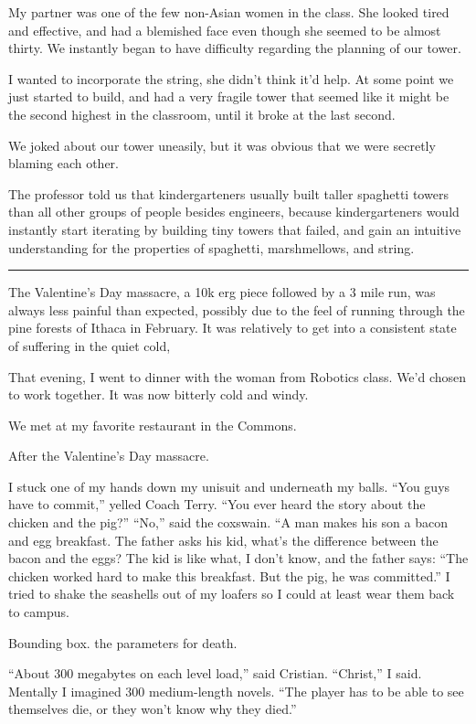 My partner was one of the few non-Asian women in the class.  She looked tired
and effective, and had a blemished face even though she seemed to be almost
thirty.  We instantly began to have difficulty regarding the planning of our
tower.  

I wanted to incorporate the string, she didn't think it'd help.  At some point
we just started to build, and had a very fragile tower that seemed like it might
be the second highest in the classroom, until it broke at the last second.

We joked about our tower uneasily, but it was obvious that we were secretly
blaming each other.

The professor told us that kindergarteners usually built taller spaghetti towers
than all other groups of people besides engineers, because kindergarteners would
instantly start iterating by building tiny towers that failed, and gain an
intuitive understanding for the properties of spaghetti, marshmellows, and
string. 

\plainfancybreak{12pt}{2}{* * *}

The Valentine's Day massacre, a 10k erg piece followed by a 3 mile run, was
always less painful than expected, possibly due to the feel of running through
the pine forests of Ithaca in February.  It was relatively to get into a
consistent state of suffering in the quiet cold, 

That evening, I went to dinner with the woman from Robotics class.  We'd chosen
to work together.  It was now bitterly cold and windy.

We met at my favorite restaurant in the Commons.



After the Valentine's Day massacre.

I stuck one of my hands down my unisuit and underneath my balls.  ``You guys
have to commit,'' yelled Coach Terry.  ``You ever heard the story about the
chicken and the pig?'' ``No,'' said the coxswain.  ``A man makes his son a bacon
and egg breakfast.  The father asks his kid, what's the difference between the
bacon and the eggs?  The kid is like what, I don't know, and the father says:
``The chicken worked hard to make this breakfast.  But the pig, he was
committed.'' I tried to shake the seashells out of my loafers so I could at
least wear them back to campus. 

Bounding box.  the parameters for death.

``About 300 megabytes on each level load,'' said Cristian.  ``Christ,'' I said.
Mentally I imagined 300 medium-length novels.  ``The player has to be able to
see themselves die, or they won't know why they died.'' 

